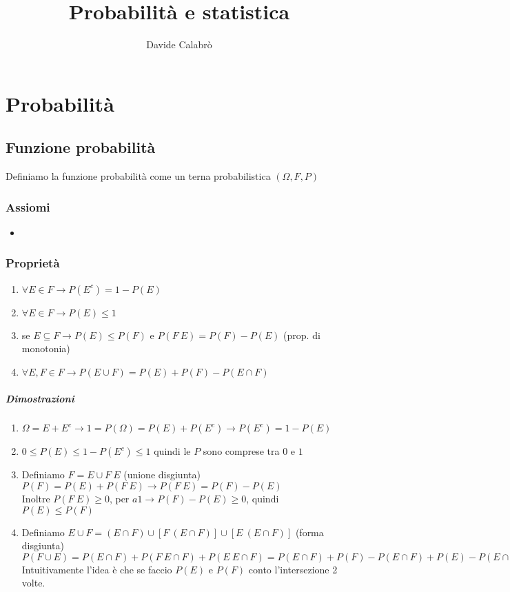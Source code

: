 \documentclass{article}
\title{Probabilità e statistica}
\author{Davide Calabrò}
\begin{document}
	\maketitle
	\newpage
	
	\newpage
	\section*{Probabilità}
	\subsection*{Funzione probabilità}
	Definiamo la funzione probabilità come un terna probabilistica $(\Omega, F, P)$
	\subsubsection*{Assiomi}
	\begin{itemize}
		\item 
	\end{itemize}
	\subsubsection*{Proprietà}
	\begin{enumerate}
		\item $\forall E \in F \rightarrow P(E^c) = 1 - P(E)$
		\item $\forall E \in F \rightarrow P(E) \leq 1$
		\item se $E \subseteq F \rightarrow P(E) \leq P(F)$ e $P(F \ E) = P(F) - P(E)$ (prop. di monotonia)
		\item $\forall E, F \in F \rightarrow P(E \cup F) = P(E) + P(F) - P(E \cap F)$
	\end{enumerate}
	\subparagraph*{Dimostrazioni}
	\begin{enumerate}
		\item $\Omega = E + E^c \rightarrow 1 = P(\Omega) = P(E) + P(E^c) \rightarrow P(E^c) = 1 - P(E)$
		\item $0 \leq P(E) \leq 1 - P(E^c) \leq 1$ quindi le $P$ sono comprese tra $0$ e $1$
		\item Definiamo $F = E \cup F \ E$ (unione disgiunta)\\
			$P(F) = P(E) + P(F \ E) \rightarrow P(F \ E) = P(F) - P(E)$\\
			Inoltre $P(F \ E) \geq 0$, per $a1 \rightarrow P(F) - P(E) \geq 0$, quindi $P(E) \leq P(F)$
		\item Definiamo $E \cup F = (E \cap F) \cup [F \ (E \cap F)] \cup [E \ (E \cap F)]$ (forma disgiunta)\\
		$P(F \cup E) = P(E \cap F) + P(F \ E \cap F) + P(E \ E \cap F) = P(E \cap F) + P(F) - P(E \cap F) + P(E) - P(E \cap F) = P(F) + P(E) - P(E \cap F)$\\
		Intuitivamente l'idea è che se faccio $P(E)$ e $P(F)$ conto l'intersezione 2 volte.		 
	\end{enumerate}
	
\end{document}
